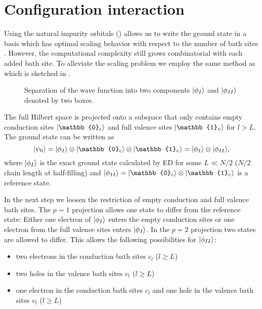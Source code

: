 \section{Configuration interaction}
\label{sec:configuration-interaction}


Using the natural impurity orbitals () allows us to
write the ground state in a basis which has optimal scaling behavior with respect to
the number of bath sites \cite{Lu2019}.
However, the computational complexity still grows combinatorial with each added bath site.
To alleviate the scaling problem we employ the same method as \citeauthor{Lu2019} \cite{Lu2019}
which is sketched in .

\begin{figure}[ht]
    \centering
    
    \caption{
        Separation of the wave function into two components
        $\lvert\phi_I\rangle$ and $\lvert\phi_{II}\rangle$ denoted by two boxes.
    }
    \label{fig:aim-separation}
\end{figure}

The full Hilbert space is projected onto a subspace that only contains
empty conduction sites $\ket{\mathbb{0}_c}$
and full valence sites $\ket{\mathbb{1}_v}$ for $l>L$.
The ground state can be written as
\begin{equation}
    \ket{\psi_0}
    =
    \ket{\phi_I} \otimes \ket{\mathbb{0}_c} \otimes \ket{\mathbb{1}_v}
    =
    \ket{\phi_I} \otimes \ket{\phi_{II}},
\end{equation}
where $\lvert\phi_I\rangle$ is the exact ground state calculated by ED for some $L\ll N/2$
($N/2$ chain length at half-filling)
and $\ket{\phi_{II}} = \ket{\mathbb{0}_c} \otimes \ket{\mathbb{1}_v}$ is a reference state.

In the next step we loosen the restriction of empty conduction and full valence bath sites.
The $p=1$ projection allows one state to differ from the reference state:
Either one electron of $\lvert\phi_I\rangle$ enters the empty conduction sites
or one electron from the full valence sites enters $\lvert\phi_I\rangle$.
In the $p=2$ projection two states are allowed to differ.
This allows the following possibilities for $\lvert\phi_{II}\rangle$:
\begin{itemize}
    \item two electrons in the conduction bath sites $c_l$ ($l\ge L$)
    \item two holes in the valence bath sites $v_l$ ($l\ge L$)
    \item one electron in the conduction bath sites $c_l$
          and one hole in the valence bath sites $v_l$ ($l\ge L$)
\end{itemize}

